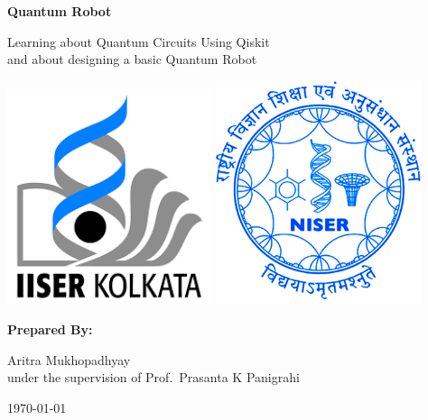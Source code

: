 \begin{titlepage}
    \begin{center}
        \vspace*{1cm}

        \textbf{\Huge Quantum Robot}

        \vspace{1cm}
        {\Large Learning about Quantum Circuits Using Qiskit\\
        and about designing a basic Quantum Robot}
        \vfill

        \includegraphics[width=6cm]{./images/IISER-K.png}
        \includegraphics[width=6cm]{./images/NISER.jpg}
        \vfill

        \textbf{\large Prepared By:}
        
        Aritra Mukhopadhyay\\
        under the supervision of Prof.\ Prasanta K Panigrahi
        \vfill

        \today

    \end{center}
\end{titlepage}